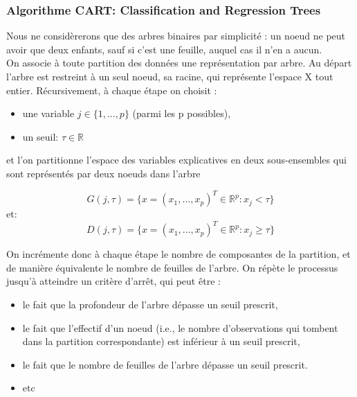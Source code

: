 \documentclass[a4paper]{article}
\theoremstyle{plain}
\begin{document}
\subsubsection{Algorithme CART: Classification and Regression Trees}

Nous ne considèrerons que des arbres binaires par simplicité : un noeud ne peut avoir que deux enfants, sauf si c’est une feuille, auquel cas il n’en a
aucun.\\

On associe à toute partition des données une représentation par arbre. Au départ l’arbre est restreint à
un seul noeud, sa racine, qui représente l’espace X tout entier. Récursivement, à chaque étape on choisit :
\begin{itemize}
\item une variable $j \in \{1,...,p\}$ (parmi les p possibles), 
\item un seuil: $\tau \in \mathbb{R}$ 
\end{itemize}

 
et l’on partitionne l’espace des variables explicatives en deux sous-ensembles qui sont représentés par deux noeuds dans l’arbre 

$$G(j,\tau) = \{ x= (x_1,...,x_p)^T \in \mathbb{R}^p : x_j < \tau \}$$
et: 
$$D(j,\tau) = \{ x= (x_1,...,x_p)^T \in \mathbb{R}^p : x_j \geq \tau \}$$


On incrémente donc à chaque étape le nombre de composantes de la partition, et de manière équivalente le nombre de feuilles de l’arbre. On répète le processus jusqu’à atteindre un critère d’arrêt, qui peut être :
\begin{itemize}
\item le fait que la profondeur de l’arbre dépasse un seuil prescrit,
\item le fait que l’effectif d’un noeud (i.e., le nombre d’observations qui tombent dans la partition correspondante)
est inférieur à un seuil prescrit,
\item le fait que le nombre de feuilles de l’arbre dépasse un seuil prescrit.
\item etc
\end{itemize}
\end{document}
